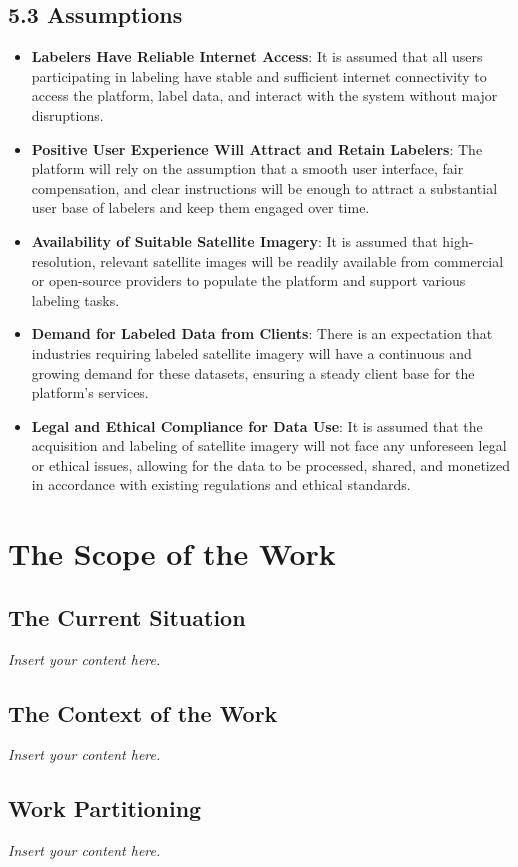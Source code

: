 \documentclass[12pt]{article}
\newcommand{\lips}{\textit{Insert your content here.}}
\begin{document}
\subsection*{5.3 Assumptions}
\begin{itemize}[leftmargin=2cm]
    \item \textbf{Labelers Have Reliable Internet Access}: It is assumed that all users participating in labeling have stable and sufficient internet connectivity to access the platform, label data, and interact with the system without major disruptions.
    \item \textbf{Positive User Experience Will Attract and Retain Labelers}: The platform will rely on the assumption that a smooth user interface, fair compensation, and clear instructions will be enough to attract a substantial user base of labelers and keep them engaged over time.
    \item \textbf{Availability of Suitable Satellite Imagery}: It is assumed that high-resolution, relevant satellite images will be readily available from commercial or open-source providers to populate the platform and support various labeling tasks.
    \item \textbf{Demand for Labeled Data from Clients}: There is an expectation that industries requiring labeled satellite imagery will have a continuous and growing demand for these datasets, ensuring a steady client base for the platform’s services.
    \item \textbf{Legal and Ethical Compliance for Data Use}: It is assumed that the acquisition and labeling of satellite imagery will not face any unforeseen legal or ethical issues, allowing for the data to be processed, shared, and monetized in accordance with existing regulations and ethical standards.
\end{itemize}

\section{The Scope of the Work}
\subsection{The Current Situation}
\lips
\subsection{The Context of the Work}
\lips
\subsection{Work Partitioning}
\lips
\end{document}
